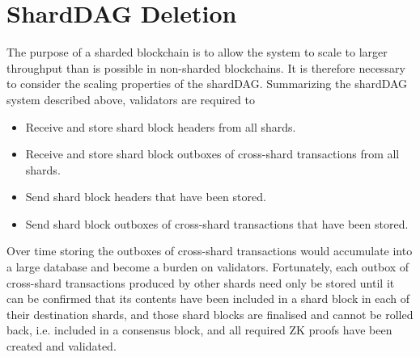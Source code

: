 \section{ShardDAG Deletion}
\label{appendix:shardDAG-deletion}
The purpose of a sharded blockchain is to allow the system to scale to larger throughput than is possible in non-sharded blockchains. 
It is therefore necessary to consider the scaling properties of the shardDAG. 
Summarizing the shardDAG system described above, validators are required to
\begin{itemize}
	\item Receive and store shard block headers from all shards.
	\item Receive and store shard block outboxes of cross-shard transactions from all shards.
	\item Send shard block headers that have been stored.
	\item Send shard block outboxes of cross-shard transactions that have been stored.
\end{itemize}

Over time storing the outboxes of cross-shard transactions would accumulate into a large database and become a burden on validators. 
Fortunately, each outbox of cross-shard transactions produced by other shards need only be stored until it can be confirmed that its contents have been included in a shard block in each of their destination shards, and those shard blocks are finalised and cannot be rolled back, i.e. included in a consensus block, and all required ZK proofs have been created and validated.

